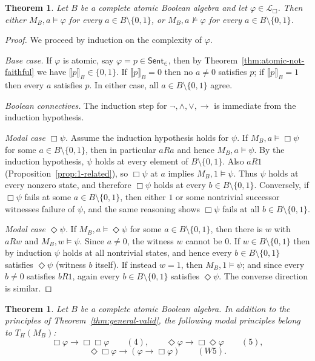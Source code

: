 \documentclass[10pt,a4paper]{amsart}
\newtheorem{theorem}[definition]{Theorem}
\newcommand{\Sent}{\mathsf{Sent}}
\newcommand{\Lbox}{\mathcal L_{\Box}} %
\newcommand{\val}[1]{\llbracket #1\rrbracket_B}
\begin{document}
\begin{theorem}\label{thm:atomic-uniformity}
Let $B$ be a complete atomic Boolean algebra and let $\varphi\in\Lbox$.
Then either $M_B,a\models \varphi$ for every $a\in B\setminus\{0,1\}$, or $M_B,a\not\models \varphi$ for every
$a\in B\setminus\{0,1\}$.
\end{theorem}

\begin{proof}
We proceed by induction on the complexity of $\varphi$.

\smallskip\noindent\emph{Base case.}
If $\varphi$ is atomic, say $\varphi=p\in\Sent_{\in}$, then by Theorem~\ref{thm:atomic-not-faithful} we have
$\val{p}\in\{0,1\}$. If $\val{p}=0$ then no $a\ne 0$ satisfies $p$; if $\val{p}=1$ then every $a$ satisfies $p$.
In either case, all $a\in B\setminus\{0,1\}$ agree.

\smallskip\noindent\emph{Boolean connectives.}
The induction step for $\neg,\wedge,\vee,\to$ is immediate from the induction hypothesis.

\smallskip\noindent\emph{Modal case $\Box\psi$.}
Assume the induction hypothesis holds for $\psi$.
If $M_B,a\models \Box\psi$ for some $a\in B\setminus\{0,1\}$, then in particular $aRa$ and hence $M_B,a\models\psi$.
By the induction hypothesis, $\psi$ holds at every element of $B\setminus\{0,1\}$.
Also $aR1$ (Proposition~\ref{prop:1-related}), so $\Box\psi$ at $a$ implies $M_B,1\models\psi$.
Thus $\psi$ holds at every nonzero state, and therefore $\Box\psi$ holds at every $b\in B\setminus\{0,1\}$.
Conversely, if $\Box\psi$ fails at some $a\in B\setminus\{0,1\}$, then either $1$ or some nontrivial successor
witnesses failure of $\psi$, and the same reasoning shows $\Box\psi$ fails at all $b\in B\setminus\{0,1\}$.

\smallskip\noindent\emph{Modal case $\Diamond\psi$.}
If $M_B,a\models\Diamond\psi$ for some $a\in B\setminus\{0,1\}$, then there is $w$ with $aRw$ and $M_B,w\models\psi$.
Since $a\neq 0$, the witness $w$ cannot be $0$.
If $w\in B\setminus\{0,1\}$ then by induction $\psi$ holds at all nontrivial states, and hence every
$b\in B\setminus\{0,1\}$ satisfies $\Diamond\psi$ (witness $b$ itself).
If instead $w=1$, then $M_B,1\models\psi$; and since every $b\ne 0$ satisfies $bR1$, again every
$b\in B\setminus\{0,1\}$ satisfies $\Diamond\psi$.
The converse direction is similar.
\end{proof}

\begin{theorem}\label{thm:atomic-validities}
Let $B$ be a complete atomic Boolean algebra. In addition to the principles of
Theorem~\ref{thm:general-valid}, the following modal principles belong to $T_H(M_B)$:
\[
\Box\varphi \to \Box\Box\varphi\qquad (4),
\qquad
\Diamond\varphi \to \Box\Diamond\varphi\qquad (5),
\]
\[
\Diamond\Box\varphi \to (\varphi\to \Box\varphi)\qquad (W5).
\]
\end{theorem}
\end{document}
